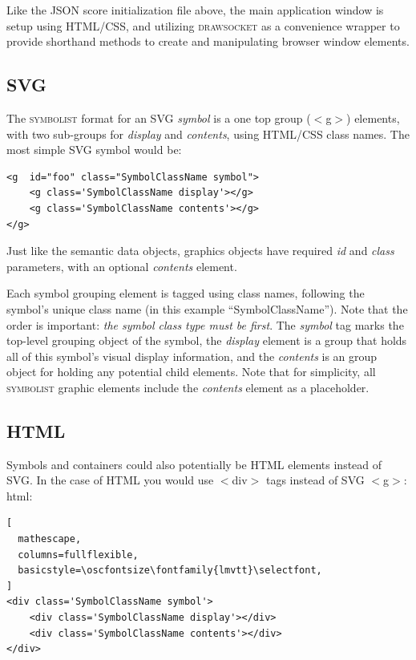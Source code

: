 \documentclass{article}
\def\symbolist{\textsc{symbolist}\xspace}
\def\drawsocket{\textsc{drawsocket}\xspace}
\def\oscfontsize{\footnotesize}
\begin{document}
Like the JSON score initialization file above, the main application window is setup using HTML/CSS, and utilizing \drawsocket as a convenience wrapper to provide shorthand methods to create and manipulating browser window elements. 

\subsection{SVG}

The \symbolist format for an SVG \textit{symbol} is a one top group ($<$g$>$) elements, with two sub-groups for \textit{display} and \textit{contents}, using HTML/CSS class names. The most simple SVG symbol would be:

\begin{lstlisting}[mathescape, columns=fullflexible, breaklines=true,basicstyle=\oscfontsize\fontfamily{lmvtt}\selectfont]
<g  id="foo" class="SymbolClassName symbol">
    <g class='SymbolClassName display'></g>
    <g class='SymbolClassName contents'></g>
</g>
\end{lstlisting}


Just like the semantic data objects, graphics objects have required \textit{id} and \textit{class} parameters, with an optional \textit{contents} element.

Each symbol grouping element is tagged using class names, following the symbol's unique class name (in this example ``SymbolClassName''). Note that the order is important: \textit{the symbol class type must be first}. The \textit{symbol} tag marks the top-level grouping object of the symbol, the \textit{display} element is a group that holds all of this symbol's visual display information, and the \textit{contents} is an group object for holding any potential child elements. Note that for simplicity, all \symbolist graphic elements include the \textit{contents} element as a placeholder.

\subsection{HTML}

Symbols and containers could also potentially be HTML elements instead of SVG. In the case of HTML you would use $<$div$>$ tags instead of SVG $<$g$>$:
html:

\begin{lstlisting}[
  mathescape,
  columns=fullflexible,
  basicstyle=\oscfontsize\fontfamily{lmvtt}\selectfont,
]
<div class='SymbolClassName symbol'>
    <div class='SymbolClassName display'></div>
    <div class='SymbolClassName contents'></div>
</div>
\end{lstlisting}
\end{document}
